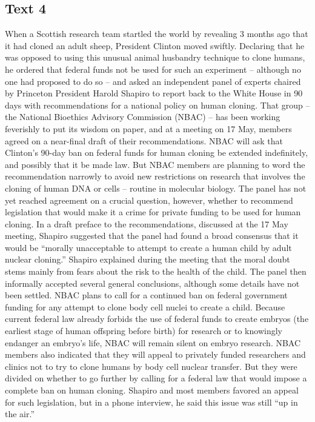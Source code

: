 \subsection{Text 4}
When a Scottish research team startled the world by revealing 3 months ago that it had cloned an adult sheep, President Clinton moved swiftly. Declaring that he was opposed to using this unusual animal husbandry technique to clone humans, he ordered that federal funds not be used for such an experiment -- although no one had proposed to do so -- and asked an independent panel of experts chaired by Princeton President Harold Shapiro to report back to the White House in 90 days with recommendations for a national policy on human cloning. That group -- the National Bioethics Advisory Commission (NBAC) -- has been working feverishly to put its wisdom on paper, and at a meeting on 17 May, members agreed on a near-final draft of their recommendations.
NBAC will ask that Clinton’s 90-day ban on federal funds for human cloning be extended indefinitely, and possibly that it be made law. But NBAC members are planning to word the recommendation narrowly to avoid new restrictions on research that involves the cloning of human DNA or cells -- routine in molecular biology. The panel has not yet reached agreement on a crucial question, however, whether to recommend legislation that would make it a crime for private funding to be used for human cloning.
In a draft preface to the recommendations, discussed at the 17 May meeting, Shapiro suggested that the panel had found a broad consensus that it would be “morally unacceptable to attempt to create a human child by adult nuclear cloning.” Shapiro explained during the meeting that the moral doubt stems mainly from fears about the risk to the health of the child. The panel then informally accepted several general conclusions, although some details have not been settled.
NBAC plans to call for a continued ban on federal government funding for any attempt to clone body cell nuclei to create a child. Because current federal law already forbids the use of federal funds to create embryos (the earliest stage of human offspring before birth) for research or to knowingly endanger an embryo’s life, NBAC will remain silent on embryo research. NBAC members also indicated that they will appeal to privately funded researchers and clinics not to try to clone humans by body cell nuclear transfer. But they were divided on whether to go further by calling for a federal law that would impose a complete ban on human cloning. Shapiro and most members favored an appeal for such legislation, but in a phone interview, he said this issue was still “up in the air.”
